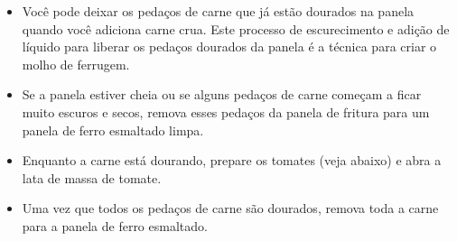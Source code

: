 \documentclass [11pt, letterpaper] {article}
\begin{document}
\begin {description}
\begin {enumerate}
\begin {itemize}
\item Você pode deixar os pedaços de carne que já estão dourados na panela quando você adiciona carne crua. Este processo de escurecimento e adição de líquido para liberar os pedaços dourados da panela é a técnica para criar o molho de ferrugem.
\item Se a panela estiver cheia ou se alguns pedaços de carne começam a ficar muito escuros e secos, remova esses pedaços da panela de fritura para um panela de ferro esmaltado limpa.
\item Enquanto a carne está dourando, prepare os tomates (veja abaixo) e abra a lata de massa de tomate.
\item Uma vez que todos os pedaços de carne são dourados, remova toda a carne para a panela de ferro esmaltado.
\end {itemize}


\end{enumerate}
\end{description}
\end{document}
